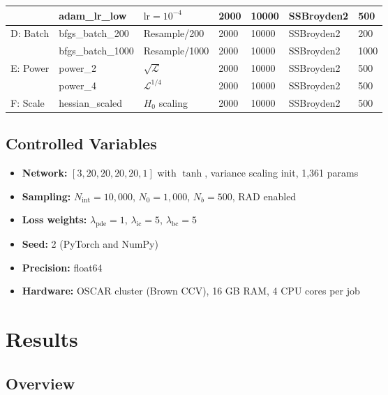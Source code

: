 \documentclass[11pt,a4paper]{article}
\begin{document}
\begin{table}[H]
\begin{tabularx}{\textwidth}{llXllll}
  & adam\_lr\_low   & $\text{lr} = 10^{-4}$  & 2000 & 10000 & SSBroyden2 & 500 \\
\midrule
\multirow{2}{*}{D: Batch}
  & bfgs\_batch\_200  & Resample/200     & 2000 & 10000 & SSBroyden2 & 200 \\
  & bfgs\_batch\_1000 & Resample/1000    & 2000 & 10000 & SSBroyden2 & 1000 \\
\midrule
\multirow{2}{*}{E: Power}
  & power\_2       & $\sqrt{\mathcal{L}}$ & 2000 & 10000 & SSBroyden2 & 500 \\
  & power\_4       & $\mathcal{L}^{1/4}$  & 2000 & 10000 & SSBroyden2 & 500 \\
\midrule
F: Scale
  & hessian\_scaled & $H_0$ scaling       & 2000 & 10000 & SSBroyden2 & 500 \\
\bottomrule
\end{tabularx}
\end{table}

\subsection{Controlled Variables}

\begin{itemize}[nosep]
  \item \textbf{Network:} $[3, 20, 20, 20, 20, 1]$ with $\tanh$, variance scaling init, 1,361 params
  \item \textbf{Sampling:} $N_{\text{int}} = 10{,}000$, $N_0 = 1{,}000$, $N_b = 500$, RAD enabled
  \item \textbf{Loss weights:} $\lambda_{\text{pde}} = 1$, $\lambda_{\text{ic}} = 5$, $\lambda_{\text{bc}} = 5$
  \item \textbf{Seed:} 2 (PyTorch and NumPy)
  \item \textbf{Precision:} float64
  \item \textbf{Hardware:} OSCAR cluster (Brown CCV), 16 GB RAM, 4 CPU cores per job
\end{itemize}


\section{Results}
\label{sec:results}

\subsection{Overview}
\end{document}
